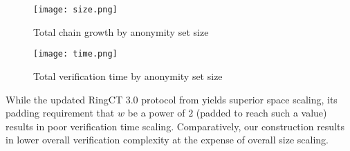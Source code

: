 \documentclass{article}
\theoremstyle{definition}
\begin{document}
\begin{figure}
\centering
\texttt{[image: size.png]}
\caption{Total chain growth by anonymity set size}
\label{fig:size}
\end{figure}

\begin{figure}
\centering
\texttt{[image: time.png]}
\caption{Total verification time by anonymity set size}
\label{fig:time}
\end{figure}

While the updated RingCT 3.0 protocol from \cite{rct3} yields superior space scaling, its padding requirement that $w$ be a power of $2$ (padded to reach such a value) results in poor verification time scaling.
Comparatively, our construction results in lower overall verification complexity at the expense of overall size scaling.




\end{document}
